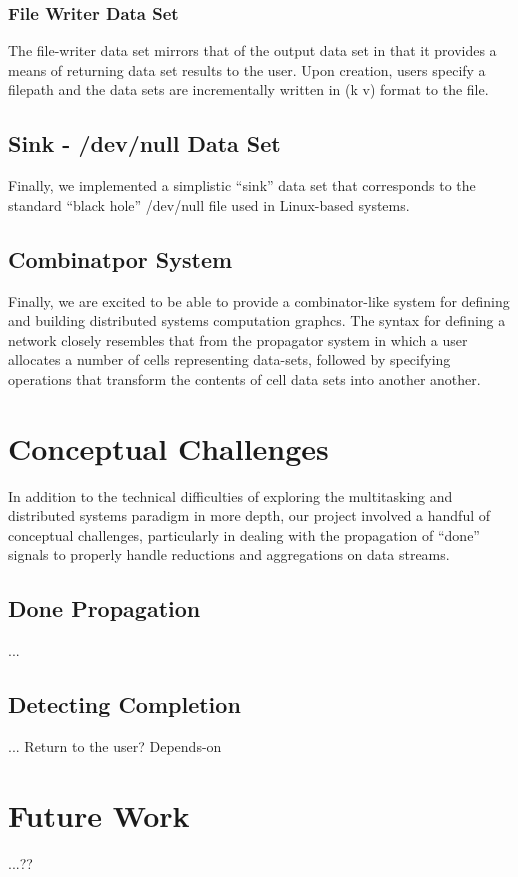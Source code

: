 \documentclass{article}
\begin{document}
\subsubsection{File Writer Data Set}
The file-writer data set mirrors that of the output data set in that
it provides a means of returning data set results to the user. Upon
creation, users specify a filepath and the data sets are incrementally
written in (k v) format to the file.

\subsection{Sink - /dev/null Data Set}

Finally, we implemented a simplistic ``sink'' data set that
corresponds to the standard ``black hole'' /dev/null file used in
Linux-based systems.

\subsection{Combinatpor System}

Finally, we are excited to be able to provide a combinator-like system
for defining and building distributed systems computation graphcs. The
syntax for defining a network closely resembles that from the
propagator system in which a user allocates a number of cells
representing data-sets, followed by specifying operations that
transform the contents of cell data sets into another another.

\section{Conceptual Challenges}

In addition to the technical difficulties of exploring the
multitasking and distributed systems paradigm in more depth, our
project involved a handful of conceptual challenges, particularly
in dealing with the propagation of ``done'' signals to properly handle
reductions and aggregations on data streams.

\subsection{Done Propagation}

...

\subsection{Detecting Completion}

... Return to the user? Depends-on

\section{Future Work}

...??
\end{document}
